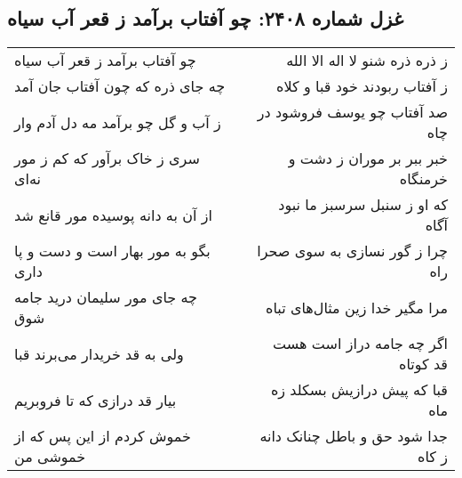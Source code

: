 \begin{center}
\section*{غزل شماره ۲۴۰۸: چو آفتاب برآمد ز قعر آب سیاه}
\label{sec:2408}
\begin{longtable}{l p{0.5cm} r}
چو آفتاب برآمد ز قعر آب سیاه
&&
ز ذره ذره شنو لا اله الا الله
\\
چه جای ذره که چون آفتاب جان آمد
&&
ز آفتاب ربودند خود قبا و کلاه
\\
ز آب و گل چو برآمد مه دل آدم وار
&&
صد آفتاب چو یوسف فروشود در چاه
\\
سری ز خاک برآور که کم ز مور نه‌ای
&&
خبر ببر بر موران ز دشت و خرمنگاه
\\
از آن به دانه پوسیده مور قانع شد
&&
که او ز سنبل سرسبز ما نبود آگاه
\\
بگو به مور بهار است و دست و پا داری
&&
چرا ز گور نسازی به سوی صحرا راه
\\
چه جای مور سلیمان درید جامه شوق
&&
مرا مگیر خدا زین مثال‌های تباه
\\
ولی به قد خریدار می‌برند قبا
&&
اگر چه جامه دراز است هست قد کوتاه
\\
بیار قد درازی که تا فروبریم
&&
قبا که پیش درازیش بسکلد زه ماه
\\
خموش کردم از این پس که از خموشی من
&&
جدا شود حق و باطل چنانک دانه ز کاه
\\
\end{longtable}
\end{center}
